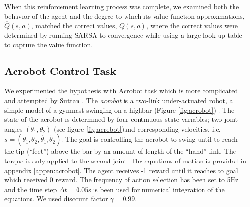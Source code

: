 \documentclass[preprint,12pt,authoryear]{elsarticle}
\begin{document}
When this reinforcement learning process was complete, we examined
both the behavior of the agent and the degree to which its value
function approximations, $\hat{Q}(s,a)$, matched the correct values,
$Q(s,a)$, where the correct values were determined by running SARSA
to convergence while using a large look-up table to capture the value
function.






\subsection{Acrobot Control Task} %
\label{sub:acrobot_control_task}
We experimented the hypothesis with Acrobot task which is more complicated and attempted by Suttan \citep{SuttonRS:1996:Coarse}. The \textit{acrobot} is a two-link under-actuated robot, a simple model of a gymnast swinging on a highbar (Figure \ref{fig:acrobot}) \citep{SuttonRS:1996:Coarse}. The state of the acrobot is determined by four continuous state variables; two joint angles $(\theta_1,\theta_2)$ (see figure \ref{fig:acrobot})and corresponding velocities, i.e. $s = (\theta_1,\theta_2,\dot{\theta_1},\dot{\theta_2}).$ The goal is controlling the acrobot to swing until to reach the tip (``feet'') above the bar by an amount of length of the ``hand'' link. The torque is only applied to the second joint. The equations of motion is provided in appendix \ref{appen:acrobot}. The agent receives -1 reward until it reaches to goal which received 0 reward. The frequency of action selection has been set to 5Hz and the time step $\Delta t = 0.05$s is been used for numerical integration of the equations. We used discount factor $\gamma = 0.99$.
\end{document}
